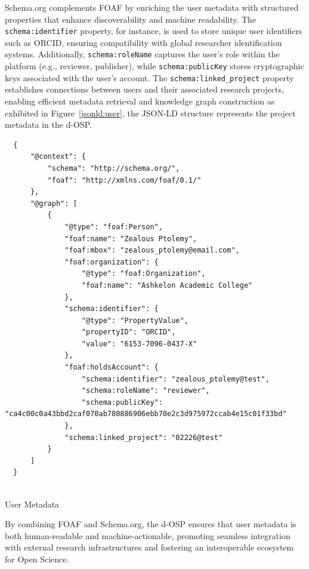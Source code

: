 \documentclass[final]{rc-book-2.14}
\begin{document}
Schema.org complements FOAF by enriching the user metadata with structured properties that enhance discoverability and machine readability. The \texttt{schema:identifier} property, for instance, is used to store unique user identifiers such as ORCID, ensuring compatibility with global researcher identification systems. Additionally, \texttt{schema:roleName} captures the user’s role within the platform (e.g., reviewer, publisher), while \texttt{schema:publicKey} stores cryptographic keys associated with the user’s account. The \texttt{schema:linked\_project} property establishes connections between users and their associated research projects, enabling efficient metadata retrieval and knowledge graph construction as exhibited in Figure~\ref{jsonld:user}, the JSON-LD structure represents the project metadata in the d-OSP.

\begin{listing}
\begin{verbatim}
  {
      "@context": {
          "schema": "http://schema.org/",
          "foaf": "http://xmlns.com/foaf/0.1/"
      },
      "@graph": [
          {
              "@type": "foaf:Person",
              "foaf:name": "Zealous Ptolemy",
              "foaf:mbox": "zealous_ptolemy@email.com",
              "foaf:organization": {
                  "@type": "foaf:Organization",
                  "foaf:name": "Ashkelon Academic College"
              },
              "schema:identifier": {
                  "@type": "PropertyValue",
                  "propertyID": "ORCID",
                  "value": "6153-7096-0437-X"
              },
              "foaf:holdsAccount": {
                  "schema:identifier": "zealous_ptolemy@test",
                  "schema:roleName": "reviewer",
                  "schema:publicKey": "ca4c00c0a43bbd2caf070ab780886906ebb70e2c3d975972ccab4e15c01f33bd"
              },
              "schema:linked_project": "02226@test"
          }
      ]
  }
  
\end{verbatim}
\caption{User Metadata}
\label{jsonld:user}
\end{listing}

By combining FOAF and Schema.org, the d-OSP ensures that user metadata is both human-readable and machine-actionable, promoting seamless integration with external research infrastructures and fostering an interoperable ecosystem for Open Science.
\end{document}
